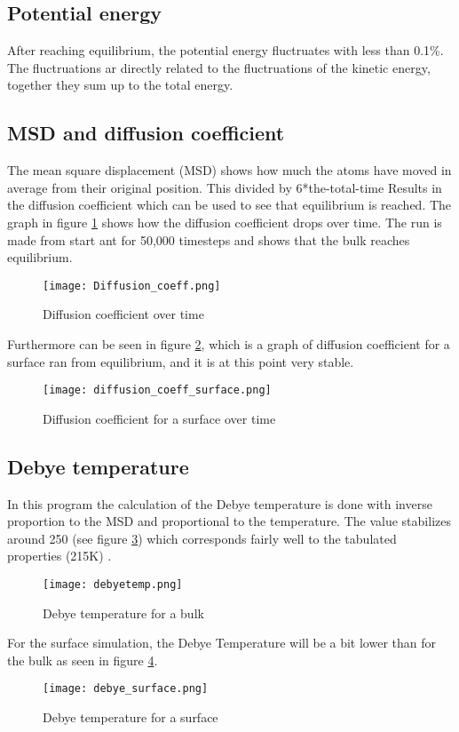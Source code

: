 \subsection{Potential energy}
After reaching equilibrium, the potential energy fluctruates with less than 0.1\%. The fluctruations ar directly related to the fluctruations of the kinetic energy, together they sum up to the total energy.

\subsection{MSD and diffusion coefficient}
The mean square displacement (MSD) shows how much the atoms have moved in average from their original position. This divided by 6*the-total-time Results in the diffusion coefficient which can be used to see that equilibrium is reached. The graph in figure \ref{fig:Diffusion_coeff} shows how the diffusion coefficient drops over time. The run is made from start ant for 50,000 timesteps and shows that the bulk reaches equilibrium. 
\begin{figure}[ht]
	\centering
	\texttt{[image: Diffusion\_coeff.png]}
	\caption{Diffusion coefficient over time}
	\label{fig:Diffusion_coeff}
\end{figure}
Furthermore can be seen in figure \ref{fig:diffusion_coeff_surface}, which is a graph of diffusion coefficient for a surface ran from equilibrium, and it is at this point very stable.
\begin{figure}[ht]
	\centering
	\texttt{[image: diffusion\_coeff\_surface.png]}
	\caption{Diffusion coefficient for a surface over time}
	\label{fig:diffusion_coeff_surface}
\end{figure}

\subsection{Debye temperature}
In this program the calculation of the Debye temperature is done with inverse proportion to the MSD and proportional to the temperature. The value stabilizes around 250 (see figure \ref{fig:debyetemp}) which corresponds fairly well to the tabulated properties (215K) \cite{bib:DebyeSilver}.
\begin{figure}[ht]
	\centering
	\texttt{[image: debyetemp.png]}
	\caption{Debye temperature for a bulk}
	\label{fig:debyetemp}
\end{figure}
For the surface simulation, the Debye Temperature will be a bit lower than for the bulk as seen in figure \ref{fig:debye_surface}.
\begin{figure}[ht]
	\centering
	\texttt{[image: debye\_surface.png]}
	\caption{Debye temperature for a surface}
	\label{fig:debye_surface}
\end{figure}

